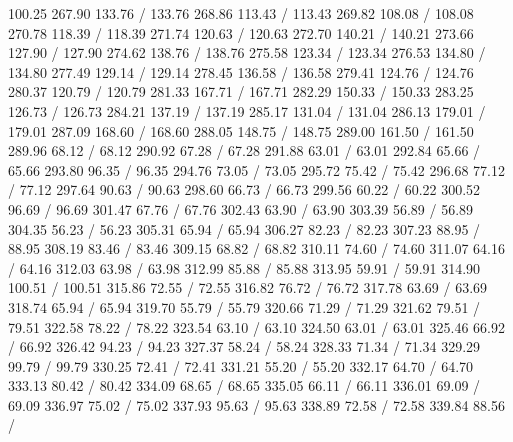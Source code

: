 { 100.25 267.90 133.76 /
 133.76 268.86 113.43 /
 113.43 269.82 108.08 /
 108.08 270.78 118.39 /
 118.39 271.74 120.63 /
 120.63 272.70 140.21 /
 140.21 273.66 127.90 /
 127.90 274.62 138.76 /
 138.76 275.58 123.34 /
 123.34 276.53 134.80 /
 134.80 277.49 129.14 /
 129.14 278.45 136.58 /
 136.58 279.41 124.76 /
 124.76 280.37 120.79 /
 120.79 281.33 167.71 /
 167.71 282.29 150.33 /
 150.33 283.25 126.73 /
 126.73 284.21 137.19 /
 137.19 285.17 131.04 /
 131.04 286.13 179.01 /
 179.01 287.09 168.60 /
 168.60 288.05 148.75 /
 148.75 289.00 161.50 /
 161.50 289.96 68.12 /
 68.12 290.92 67.28 /
 67.28 291.88 63.01 /
 63.01 292.84 65.66 /
 65.66 293.80 96.35 /
 96.35 294.76 73.05 /
 73.05 295.72 75.42 /
 75.42 296.68 77.12 /
 77.12 297.64 90.63 /
 90.63 298.60 66.73 /
 66.73 299.56 60.22 /
 60.22 300.52 96.69 /
 96.69 301.47 67.76 /
 67.76 302.43 63.90 /
 63.90 303.39 56.89 /
 56.89 304.35 56.23 /
 56.23 305.31 65.94 /
 65.94 306.27 82.23 /
 82.23 307.23 88.95 /
 88.95 308.19 83.46 /
 83.46 309.15 68.82 /
 68.82 310.11 74.60 /
 74.60 311.07 64.16 /
 64.16 312.03 63.98 /
 63.98 312.99 85.88 /
 85.88 313.95 59.91 /
 59.91 314.90 100.51 /
 100.51 315.86 72.55 /
 72.55 316.82 76.72 /
 76.72 317.78 63.69 /
 63.69 318.74 65.94 /
 65.94 319.70 55.79 /
 55.79 320.66 71.29 /
 71.29 321.62 79.51 /
 79.51 322.58 78.22 /
 78.22 323.54 63.10 /
 63.10 324.50 63.01 /
 63.01 325.46 66.92 /
 66.92 326.42 94.23 /
 94.23 327.37 58.24 /
 58.24 328.33 71.34 /
 71.34 329.29 99.79 /
 99.79 330.25 72.41 /
 72.41 331.21 55.20 /
 55.20 332.17 64.70 /
 64.70 333.13 80.42 /
 80.42 334.09 68.65 /
 68.65 335.05 66.11 /
 66.11 336.01 69.09 /
 69.09 336.97 75.02 /
 75.02 337.93 95.63 /
 95.63 338.89 72.58 /
 72.58 339.84 88.56 /
}
